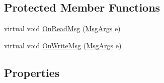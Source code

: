 \subsection*{Protected Member Functions}
\begin{DoxyCompactItemize}
\item 
virtual void \mbox{\hyperlink{class_n_t_k_1_1_n_t_k_user_a167e7153c51a74e8dfa8115aba4cca6f}{On\+Read\+Msg}} (\mbox{\hyperlink{class_n_t_k_1_1_events_args_1_1_msg_args}{Msg\+Args}} e)
\item 
virtual void \mbox{\hyperlink{class_n_t_k_1_1_n_t_k_user_a5cb9ae25e0a3621add3f636fedc73252}{On\+Write\+Msg}} (\mbox{\hyperlink{class_n_t_k_1_1_events_args_1_1_msg_args}{Msg\+Args}} e)
\end{DoxyCompactItemize}
\subsection*{Properties}
